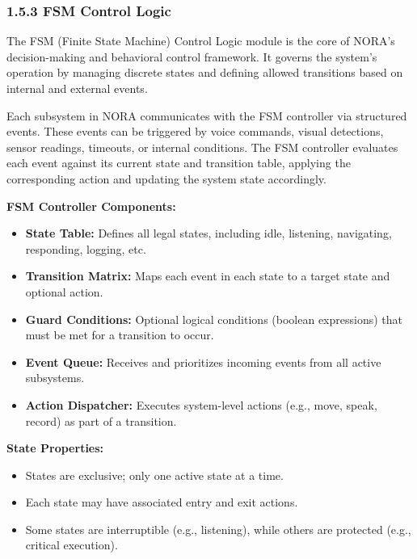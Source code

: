 \subsubsection*{1.5.3 FSM Control Logic}

The FSM (Finite State Machine) Control Logic module is the core of NORA's decision-making and behavioral control framework. It governs the system’s operation by managing discrete states and defining allowed transitions based on internal and external events.

Each subsystem in NORA communicates with the FSM controller via structured events. These events can be triggered by voice commands, visual detections, sensor readings, timeouts, or internal conditions. The FSM controller evaluates each event against its current state and transition table, applying the corresponding action and updating the system state accordingly.

\vspace{0.5cm}

\noindent\textbf{FSM Controller Components:}
\begin{itemize}
    \item \textbf{State Table:} Defines all legal states, including idle, listening, navigating, responding, logging, etc.
    \item \textbf{Transition Matrix:} Maps each event in each state to a target state and optional action.
    \item \textbf{Guard Conditions:} Optional logical conditions (boolean expressions) that must be met for a transition to occur.
    \item \textbf{Event Queue:} Receives and prioritizes incoming events from all active subsystems.
    \item \textbf{Action Dispatcher:} Executes system-level actions (e.g., move, speak, record) as part of a transition.
\end{itemize}

\vspace{0.5cm}

\noindent\textbf{State Properties:}
\begin{itemize}
    \item States are exclusive; only one active state at a time.
    \item Each state may have associated entry and exit actions.
    \item Some states are interruptible (e.g., listening), while others are protected (e.g., critical execution).
\end{itemize}

